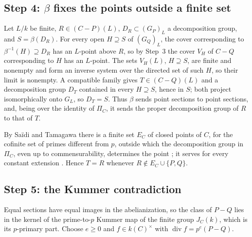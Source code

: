 \documentclass[11pt]{amsart}
\theoremstyle{remark}
\DeclareMathOperator{\divi}{div}
\begin{document}
\subsection{Step 4: $\beta$ fixes the points outside a finite set}
Let $L/k$ be finite, $R\in(C-P)(L)$, $D_R\subset (G_P)_L$ a decomposition group, and $S=\beta(D_R)$. For every open $H\supseteq S$ of $(G_Q)_L$, the cover corresponding to $\beta^{-1}(H)\supseteq D_R$ has an $L$-point above $R$, so by Step~3 the cover $V_H$ of $C-Q$ corresponding to $H$ has an $L$-point. The sets $V_H(L)$, $H\supseteq S$, are finite and nonempty and form an inverse system over the directed set of such $H$, so their limit is nonempty. A compatible family gives $T\in(C-Q)(L)$ and a decomposition group $D_T$ contained in every $H\supseteq S$, hence in $S$; both project isomorphically onto $G_L$, so $D_T=S$. Thus $\beta$ sends point sections to point sections, and, being over the identity of $\Pi_C$, it sends the proper decomposition group of $R$ to that of $T$.

By Sa\"idi and Tamagawa there is a finite set $E_C$ of closed points of $C$, for the cofinite set of primes different from $p$, outside which the decomposition group in $\Pi_C$, even up to commensurability, determines the point \cite[Definitions 1.3, 1.5, 1.10, Proposition 1.8(vi)]{ST09}; it serves for every constant extension \cite[Remark 1.2]{ST09}. Hence $T=R$ whenever $R\notin E_C\cup\{P,Q\}$.

\subsection{Step 5: the Kummer contradiction}
Equal sections have equal images in the abelianization, so the class of $P-Q$ lies in the kernel of the prime-to-$p$ Kummer map of the finite group $J_C(k)$, which is its $p$-primary part. Choose $e\ge0$ and $f\in k(C)^\times$ with $\divi f=p^e(P-Q)$.
\end{document}
